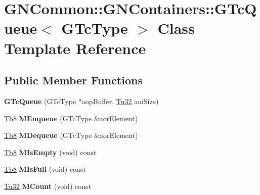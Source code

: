 \hypertarget{class_g_n_common_1_1_g_n_containers_1_1_g_tc_queue}{}\section{G\+N\+Common\+:\+:G\+N\+Containers\+:\+:G\+Tc\+Queue$<$ G\+Tc\+Type $>$ Class Template Reference}
\label{class_g_n_common_1_1_g_n_containers_1_1_g_tc_queue}
\subsection*{Public Member Functions}
\begin{DoxyCompactItemize}
\item 
\mbox{\label{class_g_n_common_1_1_g_n_containers_1_1_g_tc_queue_af221d0c44b40c12e79ff489a2098f99b}} 
{\bfseries G\+Tc\+Queue} (G\+Tc\+Type $\ast$aop\+Buffer, \mbox{\hyperlink{namespace_g_n_common_a941b527ef318f318aed7903dc832b7e4}{Tu32}} aui\+Size)
\item 
\mbox{\label{class_g_n_common_1_1_g_n_containers_1_1_g_tc_queue_adcd51c7ec007494bc5dfb5a942a0b3e2}} 
\mbox{\hyperlink{namespace_g_n_common_a8115dc7ed53b6e5b52e6bfde1632ea74}{Tb8}} {\bfseries M\+Enqueue} (G\+Tc\+Type \&aor\+Element)
\item 
\mbox{\label{class_g_n_common_1_1_g_n_containers_1_1_g_tc_queue_ad2e1a8dc45f1759c735459b2be6ffc6d}} 
\mbox{\hyperlink{namespace_g_n_common_a8115dc7ed53b6e5b52e6bfde1632ea74}{Tb8}} {\bfseries M\+Dequeue} (G\+Tc\+Type \&aor\+Element)
\item 
\mbox{\label{class_g_n_common_1_1_g_n_containers_1_1_g_tc_queue_a8e915719d76a75aacca2366c77218472}} 
\mbox{\hyperlink{namespace_g_n_common_a8115dc7ed53b6e5b52e6bfde1632ea74}{Tb8}} {\bfseries M\+Is\+Empty} (void) const
\item 
\mbox{\label{class_g_n_common_1_1_g_n_containers_1_1_g_tc_queue_a3cddbe06ba953e4de67ae00c3fb20b77}} 
\mbox{\hyperlink{namespace_g_n_common_a8115dc7ed53b6e5b52e6bfde1632ea74}{Tb8}} {\bfseries M\+Is\+Full} (void) const
\item 
\mbox{\label{class_g_n_common_1_1_g_n_containers_1_1_g_tc_queue_aa0328d6bf5a6c9d32a8be8bbe00e2950}} 
\mbox{\hyperlink{namespace_g_n_common_a941b527ef318f318aed7903dc832b7e4}{Tu32}} {\bfseries M\+Count} (void) const
\end{DoxyCompactItemize}


